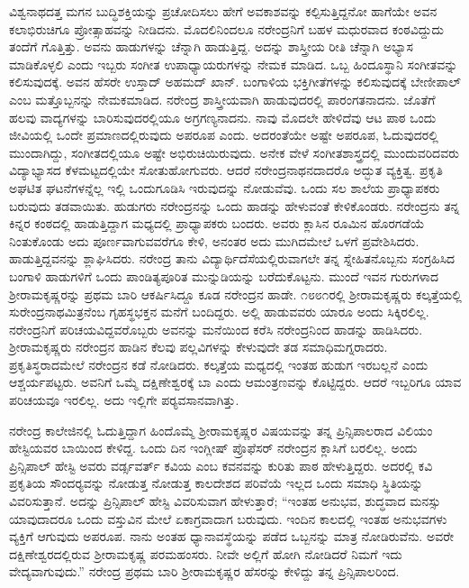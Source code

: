 ವಿಶ್ವನಾಥದತ್ತ ಮಗನ ಬುದ್ಧಿಶಕ್ತಿಯನ್ನು ಪ್ರಚೋದಿಸಲು ಹೇಗೆ ಅವಕಾಶವನ್ನು ಕಲ್ಪಿಸುತ್ತಿದ್ದನೋ ಹಾಗೆಯೇ ಅವನ ಕಲಾಭಿರುಚಿಗೂ ಪ್ರೋತ್ಸಾಹವನ್ನು ನೀಡಿದನು. ಮೊದಲಿನಿಂದಲೂ ನರೇಂದ್ರನಿಗೆ ಬಹಳ ಮಧುರವಾದ ಕಂಠವಿದ್ದುದು ತಂದೆಗೆ ಗೊತ್ತಿತ್ತು. ಅವನು ಹಾಡುಗಳನ್ನು ಚೆನ್ನಾಗಿ ಹಾಡುತ್ತಿದ್ದ. ಅದನ್ನು ಶಾಸ್ತ್ರೀಯ ರೀತಿ ಚೆನ್ನಾಗಿ ಅಭ್ಯಾಸ ಮಾಡಿಕೊಳ್ಳಲಿ ಎಂದು ಇಬ್ಬರು ಸಂಗೀತ ಉಪಾಧ್ಯಾಯರುಗಳನ್ನು ನೇಮಕ ಮಾಡಿದ. ಒಬ್ಬ ಹಿಂದೂಸ್ಥಾನಿ ಸಂಗೀತವನ್ನು ಕಲಿಸುವುದಕ್ಕೆ. ಅವನ ಹೆಸರೇ ಉಸ್ತಾದ್ ಅಹಮದ್ ಖಾನ್. ಬಂಗಾಳಿಯ ಭಕ್ತಿಗೀತೆಗಳನ್ನು ಕಲಿಸುವುದಕ್ಕೆ ಬೇಣೀಪಾಲ್ ಎಂಬ ಮತ್ತೊಬ್ಬನನ್ನು ನೇಮಕಮಾಡಿದ. ನರೇಂದ್ರ ಶಾಸ್ತ್ರೀಯವಾಗಿ ಹಾಡುವುದರಲ್ಲಿ ಪಾರಂಗತನಾದನು. ಜೊತೆಗೆ ಹಲವು ವಾದ್ಯಗಳನ್ನು ಬಾರಿಸುವುದರಲ್ಲಿಯೂ ಅಗ್ರಗಣ್ಯನಾದನು. ನಾವು ಮೊದಲೇ ಹೇಳಿದೆವು ಆಟ ಪಾಠ ಒಂದು ಜೀವಿಯಲ್ಲಿ ಒಂದೇ ಪ್ರಮಾಣದಲ್ಲಿರುವುದು ಅಪರೂಪ ಎಂದು. ಅದರಂತೆಯೇ ಅಷ್ಟೇ ಅಪರೂಪ, ಓದುವುದರಲ್ಲಿ ಮುಂದಾಗಿದ್ದು, ಸಂಗೀತದಲ್ಲಿಯೂ ಅಷ್ಟೇ ಅಭಿರುಚಿಯಿರುವುದು. ಅನೇಕ ವೇಳೆ ಸಂಗೀತಶಾಸ್ತ್ರದಲ್ಲಿ ಮುಂದುವರಿದವರು ವಿದ್ಯಾಭ್ಯಾಸದ ಕೆಳಮಟ್ಟದಲ್ಲಿಯೇ ಸೋತುಹೋಗುವರು. ಆದರೆ ನರೇಂದ್ರನಾಥನದಾದರೊ ಅದ್ಭುತ ವ್ಯಕ್ತಿತ್ವ. ಪ್ರಕೃತಿ ಅಘಟಿತ ಘಟನೆಗಳನ್ನೆಲ್ಲ ಇಲ್ಲಿ ಒಂದುಗೂಡಿಸಿ ಇರುವುದನ್ನು ನೋಡುವೆವು. ಒಂದು ಸಲ ಶಾಲೆಯ ಪ್ರಾಧ್ಯಾಪಕರು ಬರುವುದು ತಡವಾಯಿತು. ಹುಡುಗರು ನರೇಂದ್ರನನ್ನು ಒಂದು ಹಾಡನ್ನು ಹೇಳುವಂತೆ ಕೇಳಿಕೊಂಡರು. ನರೇಂದ್ರನು ತನ್ನ ಕಿನ್ನರ ಕಂಠದಲ್ಲಿ ಹಾಡುತ್ತಿದ್ದಾಗ ಮಧ್ಯದಲ್ಲಿ ಪ್ರಾಧ್ಯಾಪಕರು ಬಂದರು. ಅವರು ಕ್ಲಾಸಿನ ರೂಮಿನ ಹೊರಗಡೆಯೆ ನಿಂತುಕೊಂಡು ಅದು ಪೂರ್ಣವಾಗುವವರೆಗೂ ಕೇಳಿ, ಅನಂತರ ಅದು ಮುಗಿದಮೇಲೆ ಒಳಗೆ ಪ್ರವೇಶಿಸಿದರು. ಹಾಡುತ್ತಿದ್ದವನನ್ನು ಶ್ಲಾಘಿಸಿದರು. ನರೇಂದ್ರ ತಾನು ವಿದ್ಯಾರ್ಥಿದೆಸೆಯಲ್ಲಿರುವಾಗಲೇ ತನ್ನ ಸ್ನೇಹಿತನೊಬ್ಬನು ಸಂಗ್ರಹಿಸಿದ ಬಂಗಾಳಿ ಹಾಡುಗಳಿಗೆ ಒಂದು ಪಾಂಡಿತ್ಯಪೂರಿತ ಮುನ್ನುಡಿಯನ್ನು ಬರೆದುಕೊಟ್ಟನು. ಮುಂದೆ ಇವನ ಗುರುಗಳಾದ ಶ‍್ರೀರಾಮಕೃಷ್ಣರನ್ನು ಪ್ರಥಮ ಬಾರಿ ಆಕರ್ಷಿಸಿದ್ದೂ ಕೂಡ ನರೇಂದ್ರನ ಹಾಡೇ. ೧೮೮೧ರಲ್ಲಿ ಶ‍್ರೀರಾಮಕೃಷ್ಣರು ಕಲ್ಕತ್ತೆಯಲ್ಲಿ ಸುರೇಂದ್ರನಾಥಮಿತ್ರನೆಂಬ ಗೃಹಸ್ಥಭಕ್ತನ ಮನೆಗೆ ಬಂದಿದ್ದರು. ಅಲ್ಲಿ ಹಾಡುವವರು ಯಾರೂ ಅಂದು ಸಿಕ್ಕಿರಲಿಲ್ಲ. ನರೇಂದ್ರನಿಗೆ ಪರಿಚಯವಿದ್ದವರೊಬ್ಬರು ಅವನನ್ನು ಮನೆಯಿಂದ ಕರೆಸಿ ನರೇಂದ್ರನಿಂದ ಹಾಡನ್ನು ಹಾಡಿಸಿದರು. ಶ‍್ರೀರಾಮಕೃಷ್ಣರು ನರೇಂದ್ರನ ಹಾಡಿನ ಕೆಲವು ಪಲ್ಲವಿಗಳನ್ನು ಕೇಳುವುದೇ ತಡ ಸಮಾಧಿಮಗ್ನರಾದರು. ಪ್ರಕೃತಿಸ್ಥರಾದಮೇಲೆ ನರೇಂದ್ರನ ಕಡೆ ನೋಡಿದರು. ಕಲ್ಕತ್ತೆಯ ಮಧ್ಯದಲ್ಲಿ ಇಂತಹ ಹುಡುಗ ಇರಬಲ್ಲನೆ ಎಂದು ಆಶ್ಚರ್ಯಪಟ್ಟರು. ಅವನಿಗೆ ಒಮ್ಮೆ ದಕ್ಷಿಣೇಶ್ವರಕ್ಕೆ ಬಾ ಎಂದು ಆಮಂತ್ರಣವನ್ನು ಕೊಟ್ಟಿದ್ದರು. ಆದರೆ ಇಬ್ಬರಿಗೂ ಯಾವ ಪರಿಚಯವೂ ಇರಲಿಲ್ಲ. ಅದು ಇಲ್ಲಿಗೇ ಪರ‍್ಯವಸಾನವಾಗಿತ್ತು.

ನರೇಂದ್ರ ಕಾಲೇಜಿನಲ್ಲಿ ಓದುತ್ತಿದ್ದಾಗ ಹಿಂದೊಮ್ಮೆ ಶ‍್ರೀರಾಮಕೃಷ್ಣರ ವಿಷಯವನ್ನು ತನ್ನ ಪ್ರಿನ್ಸಿಪಾಲರಾದ ವಿಲಿಯಂ ಹೇಸ್ಟಿಯವರ ಬಾಯಿಂದ ಕೇಳಿದ್ದ. ಒಂದು ದಿನ ಇಂಗ್ಲೀಷ್ ಪ್ರೊಫೆಸರ್ ನರೇಂದ್ರನ ಕ್ಲಾಸಿಗೆ ಬರಲಿಲ್ಲ. ಅಂದು ಪ್ರಿನ್ಸಿಪಾಲ್ ಹೇಸ್ಟಿ ಅವರು ವರ್ಡ್ಸವರ್ತ್ ಕವಿಯ  ಎಂಬ ಕವನವನ್ನು ಕುರಿತು ಪಾಠ ಹೇಳುತ್ತಿದ್ದರು. ಅದರಲ್ಲಿ ಕವಿ ಪ್ರಕೃತಿಯ ಸೌಂದರ‍್ಯವನ್ನು ನೋಡುತ್ತ ನೋಡುತ್ತ ಕಾಲದೇಶದ ಪರಿವೆಯೆ ಇಲ್ಲದ ಒಂದು ಸಮಾಧಿ ಸ್ಥಿತಿಯನ್ನು ವಿವರಿಸುತ್ತಾನೆ. ಅದನ್ನು ಪ್ರಿನ್ಸಿಪಾಲ್ ಹೇಸ್ಟಿ ವಿವರಿಸುವಾಗ ಹೇಳುತ್ತಾರೆ; “ಇಂತಹ ಅನುಭವ, ಶುದ್ಧವಾದ ಮನಸ್ಸು ಯಾವುದಾದರೂ ಒಂದು ವಸ್ತುವಿನ ಮೇಲೆ ಏಕಾಗ್ರವಾದಾಗ ಬರುವುದು. ಇಂದಿನ ಕಾಲದಲ್ಲಿ ಇಂತಹ ಅನುಭವಗಳು ವ್ಯಕ್ತಿಗೆ ಆಗುವುದು ಅಪರೂಪ. ನಾನು ಅಂತಹ ಧ್ಯಾನಾವಸ್ಥೆಯನ್ನು ಪಡೆದ ಒಬ್ಬನನ್ನು ಮಾತ್ರ ನೋಡಿರುವೆನು. ಅವರೇ ದಕ್ಷಿಣೇಶ್ವರದಲ್ಲಿರುವ ಶ‍್ರೀರಾಮಕೃಷ್ಣ ಪರಮಹಂಸರು. ನೀವೇ ಅಲ್ಲಿಗೆ ಹೋಗಿ ನೋಡಿದರೆ ನಿಮಗೆ ಇದು ವೇದ್ಯವಾಗುವುದು.” ನರೇಂದ್ರ ಪ್ರಥಮ ಬಾರಿ ಶ‍್ರೀರಾಮಕೃಷ್ಣರ ಹೆಸರನ್ನು ಕೇಳಿದ್ದು ತನ್ನ ಪ್ರಿನ್ಸಿಪಾಲರಿಂದ.

